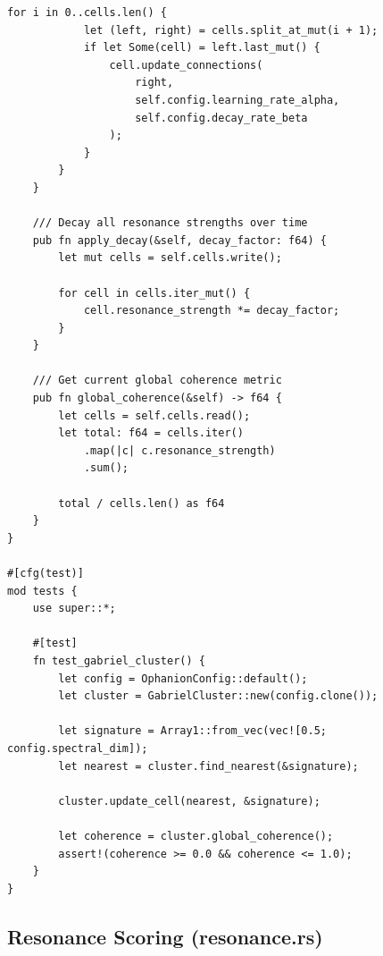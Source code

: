 \documentclass[11pt,a4paper]{article}
\begin{document}
\begin{lstlisting}[style=rust]
        for i in 0..cells.len() {
            let (left, right) = cells.split_at_mut(i + 1);
            if let Some(cell) = left.last_mut() {
                cell.update_connections(
                    right, 
                    self.config.learning_rate_alpha, 
                    self.config.decay_rate_beta
                );
            }
        }
    }
    
    /// Decay all resonance strengths over time
    pub fn apply_decay(&self, decay_factor: f64) {
        let mut cells = self.cells.write();
        
        for cell in cells.iter_mut() {
            cell.resonance_strength *= decay_factor;
        }
    }
    
    /// Get current global coherence metric
    pub fn global_coherence(&self) -> f64 {
        let cells = self.cells.read();
        let total: f64 = cells.iter()
            .map(|c| c.resonance_strength)
            .sum();
        
        total / cells.len() as f64
    }
}

#[cfg(test)]
mod tests {
    use super::*;
    
    #[test]
    fn test_gabriel_cluster() {
        let config = OphanionConfig::default();
        let cluster = GabrielCluster::new(config.clone());
        
        let signature = Array1::from_vec(vec![0.5; config.spectral_dim]);
        let nearest = cluster.find_nearest(&signature);
        
        cluster.update_cell(nearest, &signature);
        
        let coherence = cluster.global_coherence();
        assert!(coherence >= 0.0 && coherence <= 1.0);
    }
}
\end{lstlisting}

\subsection{Resonance Scoring (resonance.rs)}
\end{document}

